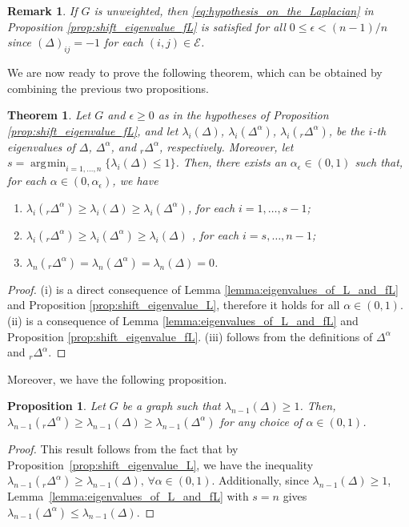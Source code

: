 \documentclass[a4paper,12pt]{article}
\newtheorem{theorem}{Theorem}
\newtheorem{remark}{Remark}
\newtheorem{proposition}{Proposition}
\DeclareMathOperator*{\argmin}{\arg\!\min}
\newcommand{\cE}{\mathcal{E}}
\newcommand{\fL}{\Delta^\alpha}
\newcommand{\rfL}{{}_r\fL}
\begin{document}
\begin{remark}
   If $G$ is unweighted, then \eqref{eq:hypothesis_on_the_Laplacian} in Proposition \ref{prop:shift_eigenvalue_fL} is satisfied for all $0\leq\epsilon<(n-1)/n$ since $(\Delta)_{ij} = -1$ for each $(i,j)\in\cE$.
\end{remark}

We are now ready to prove the following theorem, which can be obtained by combining the previous two propositions.

\begin{theorem}\label{thm:eigenvalues_of_L_fL_and_rfL}
Let $G$ and $\epsilon\geq0$ as in the hypotheses of Proposition \ref{prop:shift_eigenvalue_fL}, and let $\lambda_i(\Delta)$, $\lambda_i(\fL)$, $\lambda_i(\rfL)$, be the $i$-th eigenvalues of $\Delta$, $\fL$, and $\rfL$, respectively. Moreover, let $s=\argmin_{i=1,\dots,n}\{\lambda_{i}(\Delta)\leq1\}$. Then, there exists an $\alpha_{\epsilon}\in(0,1)$ such that, for each $\alpha\in(0,\alpha_\epsilon)$, we have
\begin{enumerate}[label=\normalfont{(\roman*)}]
    \item $\lambda_i(\rfL) \geq \lambda_i(\Delta) \geq \lambda_i(\fL)$, for each $i=1,\dots,s-1$; 
    \item $\lambda_i(\rfL) \geq \lambda_i(\fL) \geq \lambda_i(\Delta)$ ,  for each $i=s,\dots,n-1$;
    \item $\lambda_n(\rfL)=\lambda_n(\fL)=\lambda_n(\Delta)=0$.
\end{enumerate}
\end{theorem}
\begin{proof}
(i) is a direct consequence of Lemma \ref{lemma:eigenvalues_of_L_and_fL} and Proposition \ref{prop:shift_eigenvalue_L}, therefore it holds for all $\alpha\in(0,1)$. (ii) is a consequence of Lemma \ref{lemma:eigenvalues_of_L_and_fL} and Proposition \ref{prop:shift_eigenvalue_fL}. (iii) follows from the definitions of $\fL$ and $\rfL$.
\end{proof}

Moreover, we have the following proposition.
\begin{proposition} \label{prop:alg_conn_L_fL_and_rfL}
Let $G$ be a graph such that $\lambda_{n-1}(\Delta)\geq1$. Then, $\lambda_{n-1}(\rfL) \geq \lambda_{n-1}(\Delta) \geq \lambda_{n-1}(\fL)$ for any choice of $\alpha\in(0,1)$.
\end{proposition}
\begin{proof}
This result follows from the fact that by Proposition~\ref{prop:shift_eigenvalue_L}, we have the inequality
$\lambda_{n-1}({}_r\Delta^{\alpha})\geq \lambda_{n-1}(\Delta), \, \forall \alpha\in(0,1)$. Additionally, since $\lambda_{n-1}(\Delta)\geq1$, Lemma~\ref{lemma:eigenvalues_of_L_and_fL}
with $s = n$ gives $\lambda_{n-1}(\Delta^{\alpha}) \leq \lambda_{n-1}(\Delta)$.
\end{proof}
\end{document}
